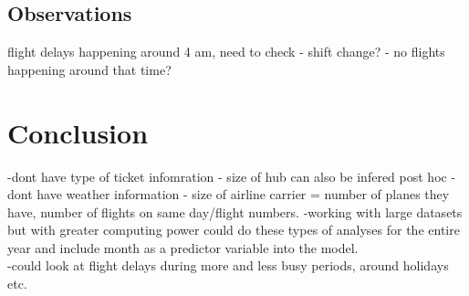 \documentclass[a4paper, 10pt]{article}
\begin{document}
\subsection{Observations}
flight delays happening around 4 am, need to check
- shift change?
- no flights happening around that time?

\section{Conclusion}
-dont have type of ticket infomration
- size of hub can also be infered post hoc
- dont have weather information
- size of airline carrier = number of planes they have, number of flights on same day/flight numbers.
-working with large datasets but with greater computing power could do these types of analyses for the entire year and include month as a predictor variable into the model.\\
-could look at flight delays during more and less busy periods, around holidays etc.\\
\end{document}
